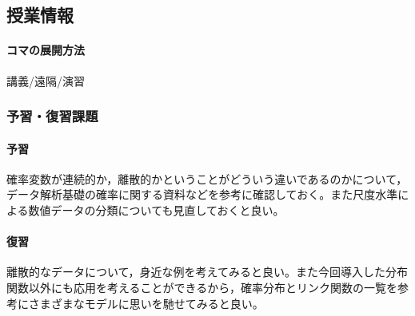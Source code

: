 \subsection{授業情報}
\paragraph{コマの展開方法}
講義/遠隔/演習
\subsubsection{予習・復習課題}
\paragraph{予習}確率変数が連続的か，離散的かということがどういう違いであるのかについて，データ解析基礎の確率に関する資料などを参考に確認しておく。また尺度水準による数値データの分類についても見直しておくと良い。
\paragraph{復習}離散的なデータについて，身近な例を考えてみると良い。また今回導入した分布関数以外にも応用を考えることができるから，確率分布とリンク関数の一覧を参考にさまざまなモデルに思いを馳せてみると良い。